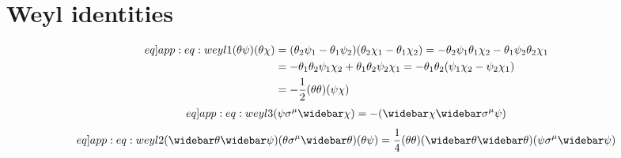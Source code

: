 \documentclass[english, notitlepage]{article}
\begin{document}
            \appendix
\section{Weyl identities}
    \begin{align} \label[eq]{app:eq:weyl1} \nonumber
        (\theta\psi)(\theta\chi) & = (\theta_2\psi_1 - \theta_1\psi_2) (\theta_2\chi_1 - \theta_1\chi_2) = -\theta_2\psi_1\theta_1\chi_2 - \theta_1\psi_2\theta_2\chi_1 \\ \nonumber
                                 & = -\theta_1\theta_2\psi_1\chi_2 + \theta_1\theta_2\psi_2\chi_1 = -\theta_1\theta_2 (\psi_1\chi_2 - \psi_2\chi_1)                     \\
                                 & = -\frac{1}{2} (\theta\theta) (\psi\chi)
    \end{align}
    \begin{align} \label[eq]{app:eq:weyl3}
        (\psi \sigma^\mu \wbar\chi) = -(\wbar\chi \wbar\sigma^\mu \psi)
    \end{align}
    \begin{align} \label[eq]{app:eq:weyl2}
        (\wbar\theta\wbar\psi) (\theta\sigma^\mu\wbar\theta) (\theta\psi) = \frac{1}{4} (\theta\theta) (\wbar\theta\wbar\theta) (\psi\sigma^\mu\wbar\psi)
    \end{align}
\end{document}
